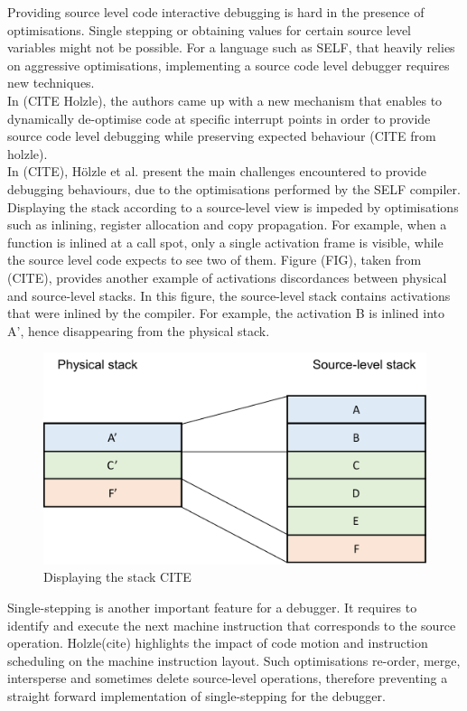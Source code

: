 Providing source level code interactive debugging is hard in the presence of optimisations.
Single stepping or obtaining values for certain source level variables might not be possible.
For a language such as SELF, that heavily relies on aggressive optimisations, implementing a source code level debugger requires new techniques.\\

In (CITE Holzle), the authors came up with a new mechanism that enables to dynamically de-optimise code at specific interrupt points in order to provide source code level debugging while preserving expected behaviour (CITE from holzle).\\

In (CITE), Hölzle et al. present the main challenges encountered to provide debugging behaviours, due to the optimisations performed by the SELF compiler. 
Displaying the stack according to a source-level view is impeded by optimisations such as inlining, register allocation and copy propagation.
For example, when a function is inlined at a call spot, only a single activation frame is visible, while the source level code expects to see two of them.
Figure (FIG), taken from (CITE), provides another example of activations discordances between physical and source-level stacks.
In this figure, the source-level stack contains activations that were inlined by the compiler. For example, the activation B is inlined into A', hence disappearing from the physical stack.\\
\begin{figure}[h]
\centering
\includegraphics[scale=0.5]{Figures/Figure1}
\decoRule
\caption[physical vs. source-level stacks]{Displaying the stack CITE}
\end{figure}

Single-stepping is another important feature for a debugger. 
It requires to identify and execute the next machine instruction that corresponds to the source operation.
Holzle(cite) highlights the impact of code motion and instruction scheduling on the machine instruction layout. 
Such optimisations re-order, merge, intersperse and sometimes delete source-level operations, therefore preventing a straight forward implementation of single-stepping for the debugger.\\

